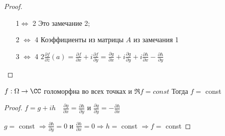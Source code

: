 \begin{proof}\thmslashn
	
	\begin{enumerate}
		\item [1$\Leftrightarrow$ 2]
		Это замечание 2;
		
		\item [2 $\Leftrightarrow$ 4]
		Коэффициенты из матрицы $A$ из замечания 1
		
		\item[3 $\Leftrightarrow$ 4]
		$2\frac{\partial f}{\partial \bar{z}} (a) =  \frac{\partial f}{\partial x} + i\frac{\partial f}{\partial y} =  \frac{\partial g}{\partial x} + i\frac{\partial g}{\partial y} + i\frac{\partial h}{\partial x} - \frac{\partial h}{\partial y}$
		
	\end{enumerate}
	
\end{proof}

\begin{consequence}\thmslashn
	
	$f:\Omega \to \CC$ голоморфна во всех точках и $\Re f = const$ Тогда $f = $ const
	
\end{consequence}

\begin{proof}\thmslashn
	
	$f = g  + ih \quad \frac{\partial g}{\partial x} = \frac{\partial h}{\partial y}$ и $\frac{\partial g}{\partial y} = - \frac{\partial h}{\partial x}$
	
	$g =$ const $ \Rightarrow \frac{\partial h}{\partial y} = 0$ и $ \frac{\partial h}{\partial x} = 0 \Rightarrow h = $ const $\Rightarrow f = $ const
\end{proof}
